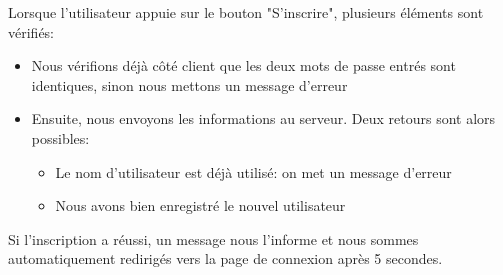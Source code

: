 \documentclass[12pt,french]{article}
\begin{document}
\newpage

Lorsque l'utilisateur appuie sur le bouton "S'inscrire", plusieurs éléments sont vérifiés:

\begin{itemize}
	\item Nous vérifions déjà côté client que les deux mots de passe entrés sont identiques, sinon nous mettons un message d'erreur
	\item Ensuite, nous envoyons les informations au serveur. Deux retours sont alors possibles:
	\begin{itemize}
		\item Le nom d'utilisateur est déjà utilisé: on met un message d'erreur
		\item Nous avons bien enregistré le nouvel utilisateur
	\end{itemize}
\end{itemize}

\medskip

Si l'inscription a réussi, un message nous l'informe et nous sommes automatiquement redirigés vers la page de connexion après 5 secondes.
\end{document}
